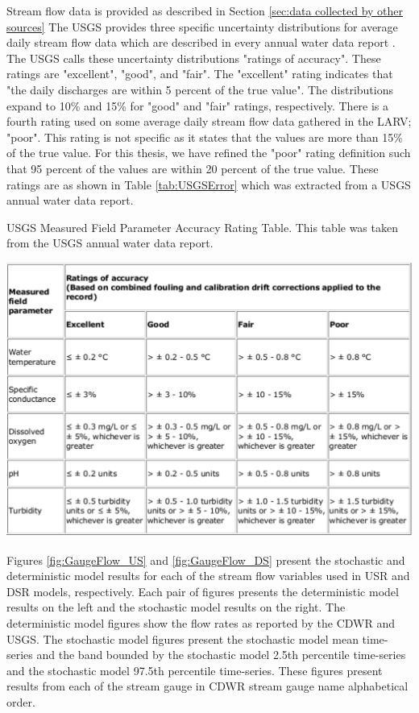 Stream flow data is provided as described in Section \ref{sec:data collected by other sources}  The USGS provides three specific uncertainty distributions for average daily stream flow data which are described in every annual water data report \parencite{USGS2006NWIS, USGS2007NWIS, USGS2008NWIS, USGS2009NWIS, USGS2010NWIS, USGS2011NWIS, USGS2012NWIS}.  The USGS calls these uncertainty distributions "ratings of accuracy".  These ratings are "excellent", "good", and "fair".  The "excellent" rating indicates that "the daily discharges are within 5 percent of the true value".  The distributions expand to 10\% and 15\% for "good" and "fair" ratings, respectively.  There is a fourth rating used on some average daily stream flow data gathered in the LARV; "poor".  This rating is not specific as it states that the values are more than 15\% of the true value.  For this thesis, we have refined the "poor" rating definition such that 95 percent of the values are within 20 percent of the true value.  These ratings are as shown in Table \ref{tab:USGSError} which was extracted from a USGS annual water data report.

\begin{table}[htbp]
	\caption[USGS Measured Field Parameter Accuracy Rating Table.]{USGS Measured Field Parameter Accuracy Rating Table.  This table was taken from the USGS annual water data report. }
	\label{tab:USGSError}
	\includegraphics[width=6in]{"Figures/USGS_error_table"}
\end{table}

Figures \ref{fig:GaugeFlow_US} and \ref{fig:GaugeFlow_DS} present the stochastic and deterministic model results for each of the stream flow variables used in USR and DSR models, respectively.  Each pair of figures presents the deterministic model results on the left and the stochastic model results on the right.  The deterministic model figures show the flow rates as reported by the CDWR and USGS.  The stochastic model figures present the stochastic model mean time-series and the band bounded by the stochastic model 2.5th percentile time-series and the stochastic model 97.5th percentile time-series.  These figures present results from each of the stream gauge in CDWR stream gauge name alphabetical order.

